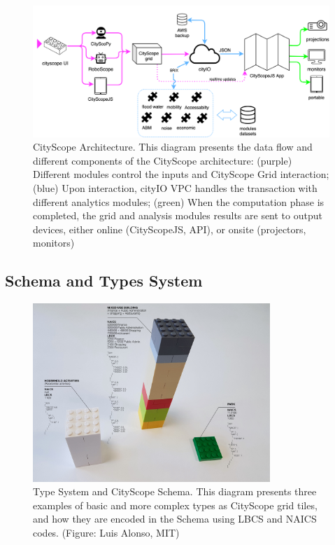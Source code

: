 {  \begin{figure}[!htb]
      \begin{center}
          \includegraphics[width=1\textwidth]{chapters/transformation/cs_arch/figures/arch/cs_arch0.png}
      \end{center}
      \caption{
          CityScope Architecture. This diagram presents the data flow and different components of the CityScope architecture: (purple) Different modules control the inputs and CityScope Grid interaction; (blue) Upon interaction, cityIO VPC handles the transaction with different analytics modules; (green) When the computation phase is completed, the grid and analysis modules results are sent to output devices, either online (CityScopeJS, API), or onsite (projectors, monitors)
      }
      \label{fig:cs_arch}
  \end{figure}

  \subsection{Schema and Types System}\label{subsec:types_system}
  {

      \begin{figure}[!htb]
          \begin{center}
              \includegraphics[width=0.8\textwidth]{chapters/transformation/cs_arch/figures/arch/cs_arch1.jpg}
          \end{center}
          \caption{Type System and CityScope Schema. This diagram presents three examples of basic and more complex types as CityScope grid tiles, and how they are encoded in the Schema using LBCS and NAICS codes. (Figure: Luis Alonso, MIT)}
          \label{fig:type_sys_schema}
      \end{figure}

}}
